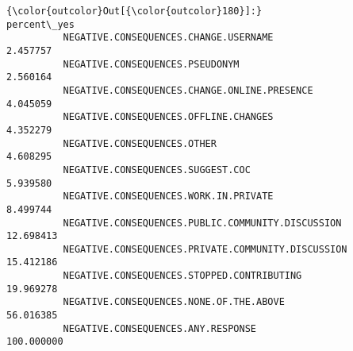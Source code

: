 \documentclass[11pt]{article}
\begin{document}
            \begin{Verbatim}[commandchars=\\\{\}]
{\color{outcolor}Out[{\color{outcolor}180}]:}                                                     percent\_yes
          NEGATIVE.CONSEQUENCES.CHANGE.USERNAME                  2.457757
          NEGATIVE.CONSEQUENCES.PSEUDONYM                        2.560164
          NEGATIVE.CONSEQUENCES.CHANGE.ONLINE.PRESENCE           4.045059
          NEGATIVE.CONSEQUENCES.OFFLINE.CHANGES                  4.352279
          NEGATIVE.CONSEQUENCES.OTHER                            4.608295
          NEGATIVE.CONSEQUENCES.SUGGEST.COC                      5.939580
          NEGATIVE.CONSEQUENCES.WORK.IN.PRIVATE                  8.499744
          NEGATIVE.CONSEQUENCES.PUBLIC.COMMUNITY.DISCUSSION     12.698413
          NEGATIVE.CONSEQUENCES.PRIVATE.COMMUNITY.DISCUSSION    15.412186
          NEGATIVE.CONSEQUENCES.STOPPED.CONTRIBUTING            19.969278
          NEGATIVE.CONSEQUENCES.NONE.OF.THE.ABOVE               56.016385
          NEGATIVE.CONSEQUENCES.ANY.RESPONSE                   100.000000
\end{Verbatim}
        

    \begin{center}
    \end{center}
    { \hspace*{\fill} \\}
    

    
    
    
    
\end{document}
